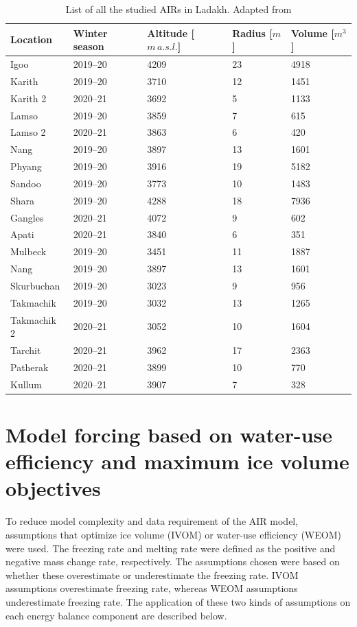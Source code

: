 \begin{table}[htb]
  \centering
  \caption{List of all the studied AIRs in Ladakh. Adapted from \citet{mariagruberIceStupasLadakh2022}}
	\label{tab:Ladakh_AIRs}
	\begin{tabular}{|lllll|}
    \hline
    \textbf{Location}     & \textbf{Winter season} & \textbf{Altitude [$m\,a.s.l.$]} & \textbf{
    Radius [$m$]} & \textbf{Volume [$m^3$]} \\ \hline
    Igoo & 2019--20 & 4209 & 23 & 4918  \\
    Karith & 2019--20 & 3710 & 12 & 1451  \\
    Karith 2 & 2020--21 & 3692 & 5 & 1133  \\
    Lamso & 2019--20 & 3859 & 7 & 615  \\
    Lamso 2& 2020--21 & 3863 & 6 & 420  \\
    Nang& 2019--20 & 3897 & 13 & 1601 \\
    Phyang& 2019--20 & 3916 & 19 & 5182 \\
    Sandoo& 2019--20 & 3773 & 10 & 1483 \\
    Shara& 2019--20 & 4288 & 18 & 7936 \\
    Gangles& 2020--21 & 4072 & 9 & 602 \\
    Apati& 2020--21 & 3840 & 6 & 351 \\
    Mulbeck& 2019--20 & 3451 & 11 & 1887\\
    Nang& 2019--20 & 3897 & 13 & 1601\\
    Skurbuchan& 2019--20 & 3023 & 9 & 956\\
    Takmachik& 2019--20 & 3032 & 13 &1265\\
    Takmachik 2& 2020--21 & 3052 & 10 &1604\\
    Tarchit& 2020--21 & 3962 & 17 &2363\\
    Patherak& 2020--21 & 3899 & 10 &770\\
    Kullum& 2020--21 & 3907 & 7 &328\\ \hline
	\end{tabular}
\end{table}

\section{Model forcing based on water-use efficiency and maximum ice volume objectives}
\label{sec:auto_software}

To reduce model complexity and data requirement of the \ac{AIR} model, assumptions that optimize ice volume (IVOM) or
water-use efficiency (WEOM) were used. The freezing rate and melting rate were defined as the positive and
negative mass change rate, respectively. The assumptions chosen were based on whether these overestimate or
underestimate the freezing rate. IVOM assumptions overestimate freezing rate, whereas WEOM assumptions
underestimate freezing rate. The application of these two kinds of assumptions on each energy balance component
are described below. 

